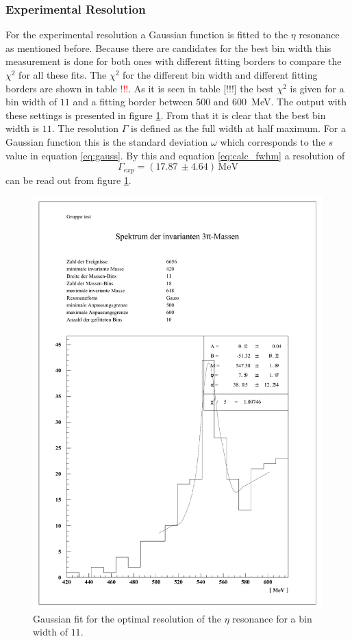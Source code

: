 \documentclass[10pt, a4paper, notitlepage, DIV=15]{scrartcl}
\begin{document}
\subsubsection{Experimental Resolution}
For the experimental resolution a Gaussian function is fitted to the $\eta$ resonance as mentioned before. Because there are candidates for the best bin width this measurement is done for both ones with different fitting borders to compare the $\chi^2$ for all these fits. The $\chi^2$ for the different bin width and different fitting borders are shown in table \textcolor{red}{!!!}. As it is seen in table [!!!] the best $\chi^2$ is given for a bin width of $11$ and a fitting border between $500$ and $600\,$ MeV. The output with these settings is presented in figure \ref{fig:eta_resolution}. From that it is clear that the best bin width is $11$. The resolution $\Gamma$ is defined as the full width at half maximum. For a Gaussian function this is the standard deviation $\omega$ which corresponds to the $s$ value in equation \ref{eq:gauss}. By this and equation \ref{eq:calc_fwhm} a resolution of
\begin{equation}
	\Gamma_{exp}=(17.87\,\pm4.64)\,\text{MeV}
\end{equation}
can be read out from figure \ref{fig:eta_resolution}.
\begin{figure}[h]
	\centering
	\includegraphics[width=1\textwidth]{eta_resolution}
	\caption{Gaussian fit for the optimal resolution of the $\eta$ resonance for a bin width of $11$.}
	\label{fig:eta_resolution}
\end{figure}
\FloatBarrier
\end{document}
